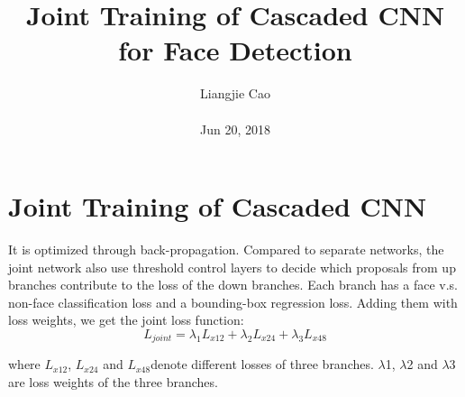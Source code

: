 \documentclass[10pt,twocolumn,letterpaper]{article}
\begin{document}
\title{\textbf{Joint Training of Cascaded CNN for Face Detection}}
\author{Liangjie Cao\\\\ Jun 20, 2018}
\maketitle
\section{Joint Training of Cascaded CNN}
It is optimized through back-propagation. Compared to separate networks, the joint network also use threshold control layers to decide which proposals from up branches contribute to the loss of the down branches. Each branch has a face v.s. non-face classification loss and a bounding-box regression loss. Adding them with loss weights, we get the joint loss function:
\begin{equation}
L_{joint}=\lambda_{1}L_{x12}+\lambda_{2}L_{x24}+\lambda_{3}L_{x48}
\end{equation}
\par where $L_{x12}$, $L_{x24}$ and $L_{x48}$denote different losses of three branches. $\lambda$1, $\lambda$2 and $\lambda$3 are loss weights of the three branches.
\end{document}
